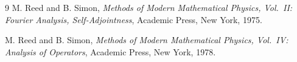 \documentclass[11pt,a4paper]{article}
\begin{document}
\begin{thebibliography}{9}
M. Reed and B. Simon, \emph{Methods of Modern Mathematical Physics, Vol.~II:
Fourier Analysis, Self-Adjointness}, Academic Press, New York, 1975.

M. Reed and B. Simon, \emph{Methods of Modern Mathematical Physics, Vol.~IV:
Analysis of Operators}, Academic Press, New York, 1978.
\end{thebibliography}
\end{document}
